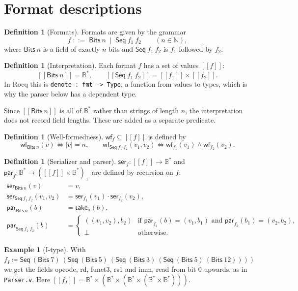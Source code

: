 \documentclass[11pt,a4paper]{article}
\theoremstyle{plain}
\theoremstyle{definition}
\newtheorem{definition}[theorem]{Definition}
\newtheorem{example}[theorem]{Example}
\theoremstyle{remark}
\newcommand{\B}{\mathbb{B}}
\newcommand{\N}{\mathbb{N}}
\newcommand{\fail}{\bot}
\newcommand{\take}{\mathsf{take}}
\newcommand{\ser}{\mathsf{ser}}
\newcommand{\parse}{\mathsf{par}}
\newcommand{\wf}{\mathsf{wf}}
\newcommand{\sem}[1]{[\![ #1 ]\!]}
\newcommand{\Bits}{\mathsf{Bits}}
\newcommand{\Seq}{\mathsf{Seq}}
\newcommand{\code}[1]{\texttt{#1}}
\begin{document}
\section{Format descriptions}

\begin{definition}[Formats]
Formats are given by the grammar
\[ f \;::=\; \Bits\ n \;\mid\; \Seq\ f_1\ f_2 \qquad (n\in\N), \]
where $\Bits\ n$ is a field of exactly $n$ bits and $\Seq\ f_1\ f_2$ is $f_1$ followed by $f_2$.
\end{definition}

\begin{definition}[Interpretation]
Each format $f$ has a set of values $\sem{f}$:
\[ \sem{\Bits\ n}=\B^*, \qquad \sem{\Seq\ f_1\ f_2}=\sem{f_1}\times\sem{f_2}. \]
In Rocq this is \code{denote : fmt -> Type}, a function from values to types, which is why the parser below has a dependent type.
\end{definition}

Since $\sem{\Bits\ n}$ is all of $\B^*$ rather than strings of length $n$, the interpretation does not record field lengths. These are added as a separate predicate.

\begin{definition}[Well-formedness]
$\wf_f\subseteq\sem{f}$ is defined by
\[ \wf_{\Bits\ n}(v) \iff |v|=n, \qquad \wf_{\Seq\ f_1\ f_2}(v_1,v_2) \iff \wf_{f_1}(v_1)\wedge\wf_{f_2}(v_2). \]
\end{definition}

\begin{definition}[Serializer and parser]
$\ser_f:\sem{f}\to\B^*$ and $\parse_f:\B^*\to(\sem{f}\times\B^*)_\fail$ are defined by recursion on $f$:
\begin{align*}
\ser_{\Bits\ n}(v) &= v, \\
\ser_{\Seq\ f_1\ f_2}(v_1,v_2) &= \ser_{f_1}(v_1)\cdot\ser_{f_2}(v_2), \\
\parse_{\Bits\ n}(b) &= \take_n(b), \\
\parse_{\Seq\ f_1\ f_2}(b) &=
\begin{cases}
((v_1,v_2),b_2) & \text{if } \parse_{f_1}(b)=(v_1,b_1) \text{ and } \parse_{f_2}(b_1)=(v_2,b_2),\\
\fail & \text{otherwise.}
\end{cases}
\end{align*}
\end{definition}

\begin{example}[I-type]
With $f_I \coloneqq \Seq\ (\Bits\ 7)\ (\Seq\ (\Bits\ 5)\ (\Seq\ (\Bits\ 3)\ (\Seq\ (\Bits\ 5)\ (\Bits\ 12))))$ we get the fields opcode, rd, funct3, rs1 and imm, read from bit 0 upwards, as in \code{Parser.v}. Here $\sem{f_I}=\B^*\times(\B^*\times(\B^*\times(\B^*\times\B^*)))$.
\end{example}
\end{document}
